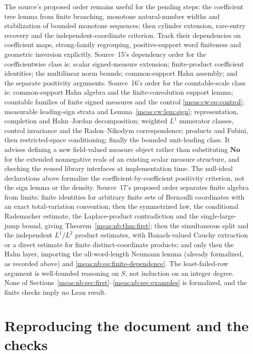 \documentclass[11pt]{article}
\numberwithin{equation}{section}
\theoremstyle{definition}
\theoremstyle{remark}
\newcommand{\No}{\mathbf{No}}
\begin{document}
The source's proposed order remains useful for the pending steps: the
coefficient tree lemma from finite branching, monotone natural-number widths
and stabilization of bounded monotone sequences; then cylinder extension,
rare-entry recovery and the independent-coordinate criterion. Track their
dependencies on coefficient maps, strong-family regrouping, positive-support
word finiteness and geometric inversion explicitly.
Source~15's dependency order for the coefficientwise class is: scalar signed-measure
extension; finite-product coefficient identities; the multilinear norm bounds;
common-support Hahn assembly; and the separate positivity arguments.
Source~16's order for the countable-scale class is: common-support Hahn algebra and
the finite-convolution support lemma; countable families of finite signed measures
and the control \eqref{meas:cw:eq:control}; measurable leading-sign strata and
Lemma~\ref{meas:cw:lem:sign}; representation, completion and Hahn--Jordan
decomposition; weighted $L^1$ numerator classes, control invariance and the
Radon--Nikodym correspondence; products and Fubini, then restricted-space
conditioning; finally the bounded unit-leading class. It advises defining a new
field-valued measure object rather than substituting $\No$ for the extended
nonnegative reals of an existing scalar measure structure, and checking the reused
library interfaces at implementation time. The null-ideal declarations above
formalize the coefficient-by-coefficient positivity criterion, not the sign lemma
or the density.
Source~17's proposed order separates finite algebra from limits: finite identities
for arbitrary finite sets of Bernoulli coordinates with an exact total-variation
convention; then the symmetrized law, the conditional Rademacher estimate, the
Laplace-product contradiction and the single-large-jump bound, giving
Theorem~\ref{meas:nb:thm:first}; then the simultaneous split and the independent
$L^1/L^2$ product estimates, with Banach-valued Cauchy extraction or a direct
estimate for finite distinct-coordinate products; and only then the Hahn layer,
importing the all-word-length Neumann lemma (already formalized, as recorded above)
and \eqref{meas:nb:eq:finite-dependence}. The least-failed-row argument is
well-founded reasoning on $S$, not induction on an integer degree. None of
Sections~\ref{meas:nb:sec:first}--\ref{meas:nb:sec:examples} is formalized, and the
finite checks imply no Lean result.

\section{Reproducing the document and the checks}\label{meas:sec:reproduce}
\end{document}
